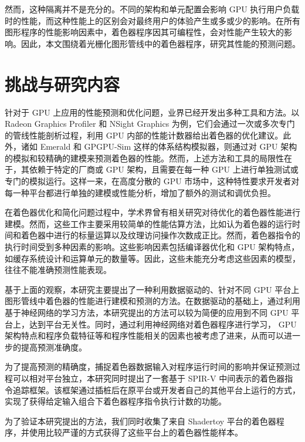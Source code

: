 然而，这种隔离并不是充分的。不同的架构和单元配置会影响 GPU 执行用户负载时的性能，而这种性能上的区别会对最终用户的体验产生或多或少的影响。在所有图形程序的性能影响因素中，着色器程序因其可编程性，会对性能产生较大的影响。因此，本文围绕着光栅化图形管线中的着色器程序，研究其性能的预测问题。

\section{挑战与研究内容}

\label{sec:challenge}

针对于 GPU 上应用的性能预测和优化问题，业界已经开发出多种工具和方法。以 Radeon Graphics Profiler\cite{AMDRGP} 和 NSight Graphics\cite{NSightGraphics} 为例，它们会通过一次或多次专门的管线性能剖析过程，利用 GPU 内部的性能计数器给出着色器的优化建议。此外，诸如 Emerald \cite{10.1145/3307650.3322221} 和 GPGPU-Sim \cite{4919648} 这样的体系结构模拟器，则通过对 GPU 架构的模拟和较精确的建模来预测着色器的性能。然而，上述方法和工具的局限性在于，其依赖于特定的厂商或 GPU 架构，且需要在每一种 GPU 上进行单独测试或专门的模拟运行。这样一来，在高度分散的 GPU 市场中，这种特性要求开发者对每一种平台都进行单独的建模或性能分析，增加了额外的测试和调优负担。

在着色器优化和简化问题过程中，学术界曾有相关研究对待优化的着色器性能进行建模\cite{10.1145/2816795.2818104, 10.1111/cgf.13482, 10.1145/3528233.3530722}。然而，这些工作主要采用较简单的性能估算方法，比如认为着色器的运行时间和着色器中进行的标量运算以及纹理访问操作次数成正比。然而，着色器指令的执行时间受到多种因素的影响。这些影响因素包括编译器优化和 GPU 架构特点，如缓存系统设计和运算单元的数量等。因此，这些未能充分考虑这些因素的模型，往往不能准确预测性能表现。

基于上面的观察，本研究主要提出了一种利用数据驱动的、针对不同 GPU 平台上图形管线中着色器的性能进行建模和预测的方法。在数据驱动的基础上，通过利用基于神经网络的学习方法，本研究提出的方法可以较为简便的应用到不同 GPU 平台上，达到平台无关性。同时，通过利用神经网络对着色器程序进行学习， GPU 架构特点和程序负载特征等和程序性能相关的因素也被考虑了进来，从而可以进一步的提高预测准确度。

为了提高预测的精确度，捕捉着色器数据输入对程序运行时间的影响并保证预测过程可以相对平台独立，本研究同时提出了一套基于 SPIR-V 中间表示\cite{SPIRV}的着色器指令追踪框架。该框架通过插桩后在原平台或开发者自己的其他平台上运行的方式，实现了获得给定输入组合下着色器程序指令执行计数的功能。

为了验证本研究提出的方法，我们同时收集了来自 Shadertoy\cite{Shadertoy} 平台的着色器程序，并使用比较严谨的方式获得了这些平台上的着色器性能样本。

